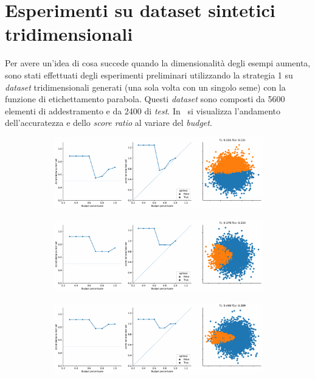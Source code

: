 \section{Esperimenti su dataset sintetici tridimensionali}\label{sec:exp:synth_3d}
Per avere un'idea di cosa succede quando la dimensionalità degli esempi aumenta, sono stati effettuati degli esperimenti preliminari utilizzando la strategia 1 su \emph{dataset} tridimensionali generati (una sola volta con un singolo seme) con la funzione di etichettamento parabola.
Questi \emph{dataset} sono composti da 5600 elementi di addestramento e da 2400 di \emph{test}.
In~ si visualizza l'andamento dell'accuratezza e dello \emph{score ratio} al variare del \emph{budget}.
\begin{figure}
    \begin{subfigure}{\textwidth}
        \centering
        \includegraphics[width=\textwidth]{img/3d/1.pdf}
    \end{subfigure}%
    \hfill
    \begin{subfigure}{\textwidth}
        \centering
        \includegraphics[width=\textwidth]{img/3d/2.pdf}
    \end{subfigure}%
    \hfill
    \begin{subfigure}{\textwidth}
        \centering
        \includegraphics[width=\textwidth]{img/3d/3.pdf}

\end{subfigure}
\end{figure}
